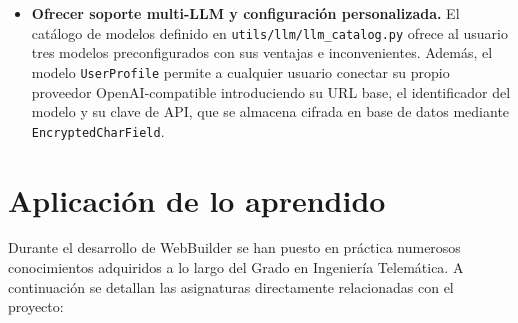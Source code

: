 \begin{itemize}
  \item \textbf{Ofrecer soporte multi-LLM y configuración personalizada.} El catálogo de modelos definido en \texttt{utils/llm/llm\_catalog.py} ofrece al usuario tres modelos preconfigurados con sus ventajas e inconvenientes. Además, el modelo \texttt{UserProfile} permite a cualquier usuario conectar su propio proveedor OpenAI-compatible introduciendo su URL base, el identificador del modelo y su clave de API, que se almacena cifrada en base de datos mediante \texttt{EncryptedCharField}.
\end{itemize}


\section{Aplicación de lo aprendido}
\label{sec:aplicacion}

Durante el desarrollo de WebBuilder se han puesto en práctica numerosos conocimientos adquiridos a lo largo del Grado en Ingeniería Telemática. A continuación se detallan las asignaturas directamente relacionadas con el proyecto:

